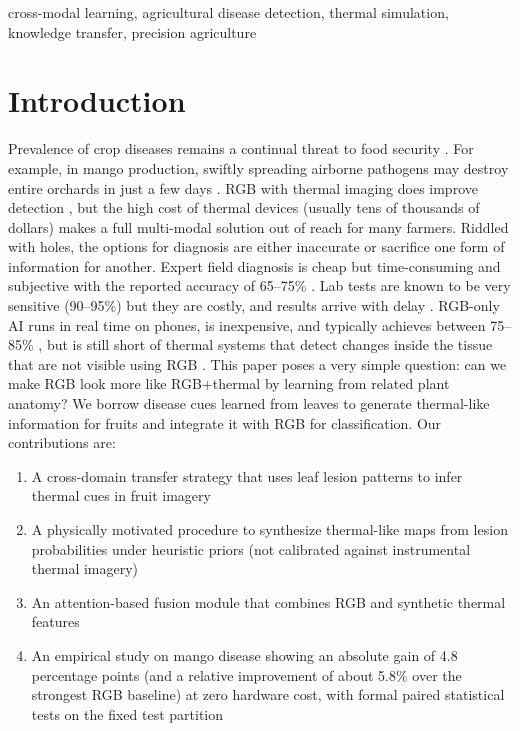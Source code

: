 \documentclass[conference]{IEEEtran}
\begin{document}
\begin{IEEEkeywords}
cross-modal learning, agricultural disease detection, thermal simulation, knowledge transfer, precision agriculture
\end{IEEEkeywords}

\section{Introduction}
Prevalence of crop diseases remains a continual threat to food security \cite{fao2021}. For example, in mango production, swiftly spreading airborne pathogens may destroy entire orchards in just a few days \cite{singh2019}. RGB with thermal imaging does improve detection \cite{khanal2017}, but the high cost of thermal devices (usually tens of thousands of dollars) makes a full multi-modal solution out of reach for many farmers.
Riddled with holes, the options for diagnosis are either inaccurate or sacrifice one form of information for another. Expert field diagnosis is cheap but time-consuming and subjective with the reported accuracy of 65--75\% \cite{ferentinos2018}. Lab tests are known to be very sensitive (90--95\%) but they are costly, and results arrive with delay \cite{martinelli2015}. RGB-only AI runs in real time on phones, is inexpensive, and typically achieves between 75--85\% \cite{mohanty2016,pineda2021}, but is still short of thermal systems that detect changes inside the tissue that are not visible using RGB \cite{pineda2021}.
This paper poses a very simple question: can we make RGB look more like RGB+thermal by learning from related plant anatomy? We borrow disease cues learned from leaves to generate thermal-like information for fruits and integrate it with RGB for classification. Our contributions are: 

\begin{enumerate}
    \item A cross-domain transfer strategy that uses leaf lesion patterns to infer thermal cues in fruit imagery
    \item A physically motivated procedure to synthesize thermal-like maps from lesion probabilities under heuristic priors (not calibrated against instrumental thermal imagery)
    \item An attention-based fusion module that combines RGB and synthetic thermal features
    \item An empirical study on mango disease showing an absolute gain of 4.8 percentage points (and a relative improvement of about 5.8\% over the strongest RGB baseline) at zero hardware cost, with formal paired statistical tests on the fixed test partition
\end{enumerate}
\end{document}
